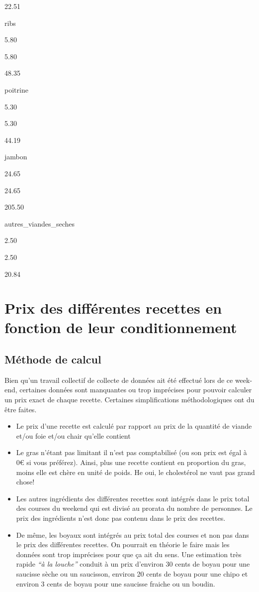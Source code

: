 \documentclass[]{article}
\begin{document}
22.51

ribs

5.80

5.80

48.35

poitrine

5.30

5.30

44.19

jambon

24.65

24.65

205.50

autres\_viandes\_seches

2.50

2.50

20.84

\hypertarget{prix-des-differentes-recettes-en-fonction-de-leur-conditionnement}{%
\section{Prix des différentes recettes en fonction de leur
conditionnement}\label{prix-des-differentes-recettes-en-fonction-de-leur-conditionnement}}

\hypertarget{methode-de-calcul}{%
\subsection{Méthode de calcul}\label{methode-de-calcul}}

Bien qu'un travail collectif de collecte de données ait été effectué
lors de ce week-end, certaines données sont manquantes ou trop
imprécises pour pouvoir calculer un prix exact de chaque recette.
Certaines simplifications méthodologiques ont du être faites.

\begin{itemize}
\item
  Le prix d'une recette est calculé par rapport au prix de la quantité
  de viande et/ou foie et/ou chair qu'elle contient
\item
  Le gras n'étant pas limitant il n'est pas comptabilisé (ou son prix
  est égal à 0€ si vous préférez). Ainsi, plus une recette contient en
  proportion du gras, moins elle est chère en unité de poids. He oui, le
  cholestérol ne vaut pas grand chose!
\item
  Les autres ingrédients des différentes recettes sont intégrés dans le
  prix total des courses du weekend qui est divisé au prorata du nombre
  de personnes. Le prix des ingrédients n'est donc pas contenu dans le
  prix des recettes.
\item
  De même, les boyaux sont intégrés au prix total des courses et non pas
  dans le prix des différentes recettes. On pourrait en théorie le faire
  mais les données sont trop imprécises pour que ça ait du sens. Une
  estimation très rapide \emph{``à la louche''} conduit à un prix
  d'environ 30 cents de boyau pour une saucisse sèche ou un saucisson,
  environ 20 cents de boyau pour une chipo et environ 3 cents de boyau
  pour une saucisse fraiche ou un boudin.
\end{itemize}
\end{document}
